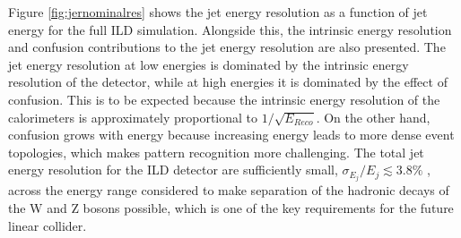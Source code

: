 Figure \ref{fig:jernominalres} shows the jet energy resolution as a function of jet energy for the full ILD simulation.  Alongside this, the intrinsic energy resolution and confusion contributions to the jet energy resolution are also presented.  The jet energy resolution at low energies is dominated by the intrinsic energy resolution of the detector, while at high energies it is dominated by the effect of confusion.  This is to be expected because the intrinsic energy resolution of the calorimeters is approximately proportional to $1 / \sqrt{E_{Reco}}$.  On the other hand, confusion grows with energy because increasing energy leads to more dense event topologies, which makes pattern recognition more challenging.  The total jet energy resolution for the ILD detector are sufficiently small, $\sigma_{E_{j}} / E_{j} \lesssim 3.8\%$ \cite{Behnke:2013lya, arXiv:0907.3577, Linssen:2012hp}, across the energy range considered to make separation of the hadronic decays of the W and Z bosons possible, which is one of the key requirements for the future linear collider.

